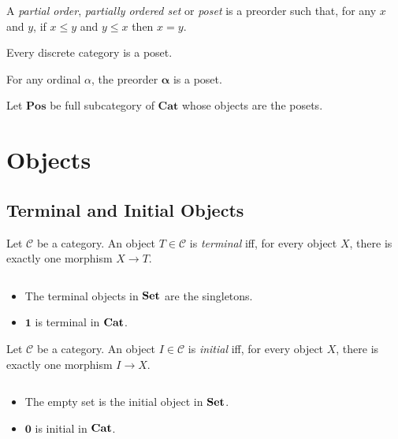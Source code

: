 \begin{df}
A \emph{partial order}, \emph{partially ordered set} or \emph{poset} is a preorder such that, for any $x$ and $y$, if $x \leq y$ and $y \leq x$ then $x = y$.
\end{df}

\begin{ex}
Every discrete category is a poset.
\end{ex}

\begin{ex}
For any ordinal $\alpha$, the preorder $\mathbf{\alpha}$ is a poset.
\end{ex}

\begin{df}
Let $\mathbf{Pos}$ be full subcategory of $\mathbf{Cat}$ whose objects are the posets.
\end{df}


\chapter{Objects}


\section{Terminal and Initial Objects}

\begin{df}
Let $\mathcal{C}$ be a category.
An object $T \in \mathcal{C}$ is \emph{terminal} iff, for every object $X$, there is exactly one morphism $X \rightarrow T$.
\end{df}

\begin{ex}$ $
\begin{itemize}
\item The terminal objects in $\mathbf{Set}$ are the singletons.
\item $\mathbf{1}$ is terminal in $\mathbf{Cat}$.
\end{itemize}
\end{ex}

\begin{df}
Let $\mathcal{C}$ be a category.
An object $I \in \mathcal{C}$ is \emph{initial} iff, for every object $X$, there is exactly one morphism $I \rightarrow X$.
\end{df}

\begin{ex}$ $
\begin{itemize}
\item
The empty set is the initial object in $\mathbf{Set}$.
\item
$\mathbf{0}$ is initial in $\mathbf{Cat}$.
\end{itemize}
\end{ex}